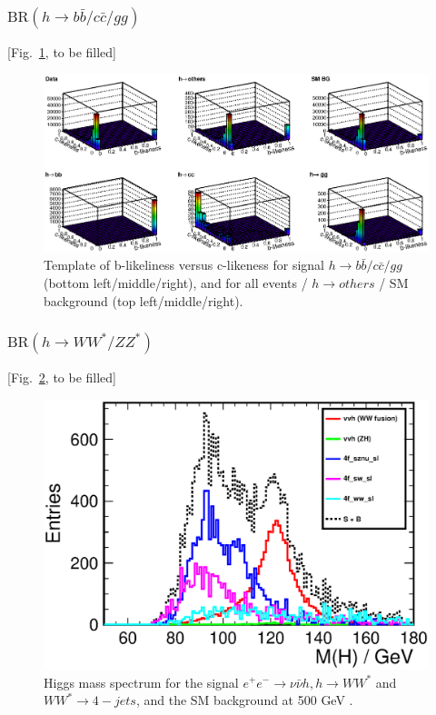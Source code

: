 \subsubsection{$\mathrm{BR}(h\to b\bar{b}/c\bar{c}/gg)$}
[Fig.~\ref{fig:qqHbbccgg250}, to be filled]
\begin{figure}
\begin{center}
\includegraphics[width=0.85\hsize]{chapters/figures/qqh_bbccgg_template_250.eps}
\end{center}
  \caption{Template of b-likeliness versus c-likeness for signal $h\to b\bar{b}/c\bar{c}/gg$
  (bottom left/middle/right),
and for all events / $h\to others$ / SM background (top left/middle/right).}
  \label{fig:qqHbbccgg250}
\end{figure}

\subsubsection{$\mathrm{BR}(h\to WW^*/ZZ^*)$}
[Fig.~\ref{fig:vvHWW500}, to be filled]
\begin{figure}
\begin{center}
\includegraphics[width=0.85\hsize]{chapters/figures/vvH_WW4j500_MassH.eps}
\end{center}
  \caption{Higgs mass spectrum for the signal $e^+e^-\to\nu\bar\nu h, h\to WW^{*}$
  and $WW^{*}\to 4-jets$, and the SM background 
  at 500 GeV \cite{H2WW500}.}
  \label{fig:vvHWW500}
\end{figure}

